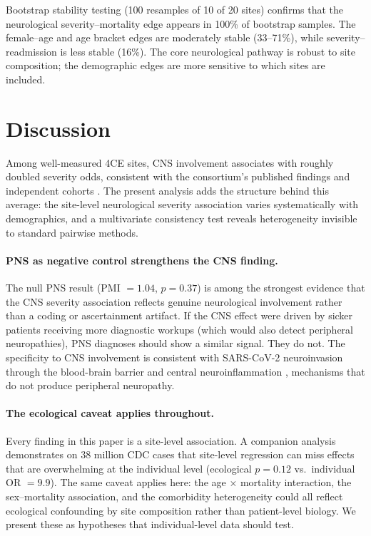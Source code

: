 \documentclass{article}
\begin{document}
Bootstrap stability testing (100 resamples of 10 of 20 sites) confirms that the neurological severity--mortality edge appears in 100\% of bootstrap samples.
The female--age and age bracket edges are moderately stable (33--71\%), while severity--readmission is less stable (16\%).
The core neurological pathway is robust to site composition; the demographic edges are more sensitive to which sites are included.


\section{Discussion}

Among well-measured 4CE sites, CNS involvement associates with roughly doubled severity odds, consistent with the consortium's published findings \cite{four_ce_neuro2021} and independent cohorts \cite{frontera2021neuro, mao2020neuro}.
The present analysis adds the structure behind this average: the site-level neurological severity association varies systematically with demographics, and a multivariate consistency test reveals heterogeneity invisible to standard pairwise methods.

\paragraph{PNS as negative control strengthens the CNS finding.}
The null PNS result (PMI $= 1.04$, $p = 0.37$) is among the strongest evidence that the CNS severity association reflects genuine neurological involvement rather than a coding or ascertainment artifact.
If the CNS effect were driven by sicker patients receiving more diagnostic workups (which would also detect peripheral neuropathies), PNS diagnoses should show a similar signal.
They do not.
The specificity to CNS involvement is consistent with SARS-CoV-2 neuroinvasion through the blood-brain barrier \cite{song2021neuroinvasion} and central neuroinflammation \cite{iadecola2020covid}, mechanisms that do not produce peripheral neuropathy.

\paragraph{The ecological caveat applies throughout.}
Every finding in this paper is a site-level association.
A companion analysis~\cite{tower2026averages} demonstrates on 38 million CDC cases that site-level regression can miss effects that are overwhelming at the individual level (ecological $p = 0.12$ vs.\ individual OR $= 9.9$).
The same caveat applies here: the age $\times$ mortality interaction, the sex--mortality association, and the comorbidity heterogeneity could all reflect ecological confounding by site composition rather than patient-level biology.
We present these as hypotheses that individual-level data should test.
\end{document}

